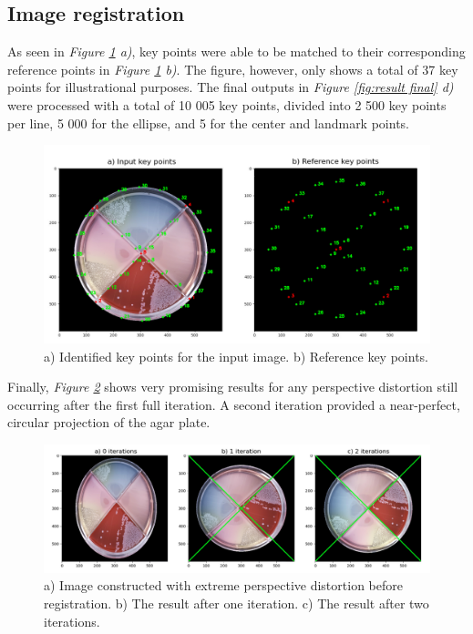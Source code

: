 \subsection{Image registration}
As seen in \textit{Figure \ref{fig:result keys} a)}, key points were able to be matched to their corresponding reference points in \textit{Figure \ref{fig:result keys} b)}. The figure, however, only shows a total of 37 key points for illustrational purposes. The final outputs in \textit{Figure \ref{fig:result final} d)} were processed with a total of 10 005 key points, divided into 2 500 key points per line, 5 000 for the ellipse, and 5 for the center and landmark points.\\  

\begin{figure}[H]
      \centering
      \includegraphics[width=1\linewidth]{figures/PDF/Image_reg.pdf}
    \caption{a) Identified key points for the input image. b) Reference key points.}
    \label{fig:result keys}
\end{figure}

\noindent Finally, \textit{Figure \ref{fig:result projection}} shows very promising results for any perspective distortion still occurring after the first full iteration. A second iteration provided a near-perfect, circular projection of the agar plate. 

\begin{figure}[H]
      \centering
      \includegraphics[width=1.1\linewidth]{figures/PDF/Projection.pdf}
    \caption{a) Image constructed with extreme perspective distortion before registration.  b) The result after one iteration. c) The result after two iterations.}
    \label{fig:result projection}
\end{figure}


